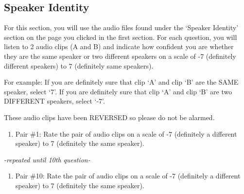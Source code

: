 \documentclass
[
    a4paper,
    twoside,
    12pt,
]
{report}
\begin{document}
\hypertarget{speaker-identity}{%
\subsection{Speaker Identity}\label{speaker-identity}}

For this section, you will use the audio files found under the `Speaker
Identity' section on the page you clicked in the first section. For each
question, you will listen to 2 audio clips (A and B) and indicate how
confident you are whether they are the same speaker or two different
speakers on a scale of -7 (definitely different speakers) to 7
(definitely same speakers).

For example: If you are definitely sure that clip `A' and clip `B' are
the SAME speaker, select `7'. If you are definitely sure that clip `A'
and clip `B' are two DIFFERENT speakers, select `-7'.

These audio clips have been REVERSED so please do not be alarmed.

\begin{enumerate}
\def\labelenumi{\arabic{enumi}.}
\tightlist
\item
  Pair \#1: Rate the pair of audio clips on a scale of -7 (definitely a
  different speaker) to 7 (definitely the same speaker).
\end{enumerate}

\begin{table}[ht]
\end{table}

\emph{-repeated until 10th question-}

\begin{enumerate}
\def\labelenumi{\arabic{enumi}.}
\setcounter{enumi}{9}
\tightlist
\item
  Pair \#10: Rate the pair of audio clips on a scale of -7 (definitely a
  different speaker) to 7 (definitely the same speaker).
\end{enumerate}
\end{document}
